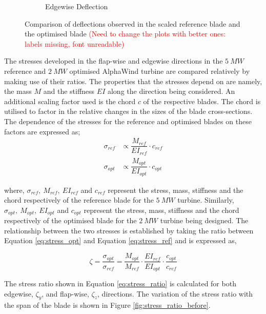 \begin{figure}[H]
\begin{subfigure}{0.60\textwidth}
\caption{Edgewise Deflection}
\label{fig:deflection_flap_compare}
\end{subfigure}
\caption{Comparison of deflections observed in the scaled reference blade and the optimised blade \textcolor{red}{(Need to change the plots with better ones: labels missing, font unreadable)} }
\label{fig:deflection_compare}
\end{figure}

The stresses developed in the flap-wise and edgewise directions in the $5\ MW$ reference and $2\ MW$ optimised AlphaWind turbine are compared relatively by making use of their ratios. The properties that the stresses depend on are namely, the mass $M$ and the stiffness $EI$ along the direction being considered. An additional scaling factor used is the chord $c$ of the respective blades. The chord is utilised to factor in the relative changes in the sizes of the blade cross-sections. The dependence of the stresses for the reference and optimised blades on these factors are expressed as;
\begin{align}
    \sigma_{ref} &\propto \dfrac{M_{ref}}{EI_{ref}}\cdot c_{ref} \label{eq:stress_ref} \\
    \sigma_{opt} &\propto \dfrac{M_{opt}}{EI_{opt}}\cdot c_{opt} \label{eq:stress_opt}
\end{align}

where, $\sigma_{ref},\ M_{ref},\ EI_{ref}$ and $c_{ref}$ represent the stress, mass, stiffness and the chord respectively of the reference blade for the  $5\ MW$ turbine. Similarly, $\sigma_{opt},\ M_{opt},\ EI_{opt}$ and $c_{opt}$ represent the stress, mass, stiffness and the chord respectively of the optimised blade for the  $2\ MW$ turbine being designed. The relationship between the two stresses is established by taking the ratio between Equation \ref{eq:stress_opt} and Equation \ref{eq:stress_ref} and is expressed as,

\begin{equation}
     \zeta = \dfrac{\sigma_{opt}}{\sigma_{ref}} = \dfrac{M_{opt}}{M_{ref}}\cdot\dfrac{EI_{ref}}{EI_{opt}}\cdot \dfrac{c_{opt}}{c_{ref}}
\label{eq:stress_ratio}
\end{equation}

The stress ratio shown in Equation \ref{eq:stress_ratio} is calculated for both edgewise, $\zeta_y$, and flap-wise, $\zeta_z$, directions. The variation of the stress ratio with the span of the blade is shown in Figure \ref{fig:stress_ratio_before}.


